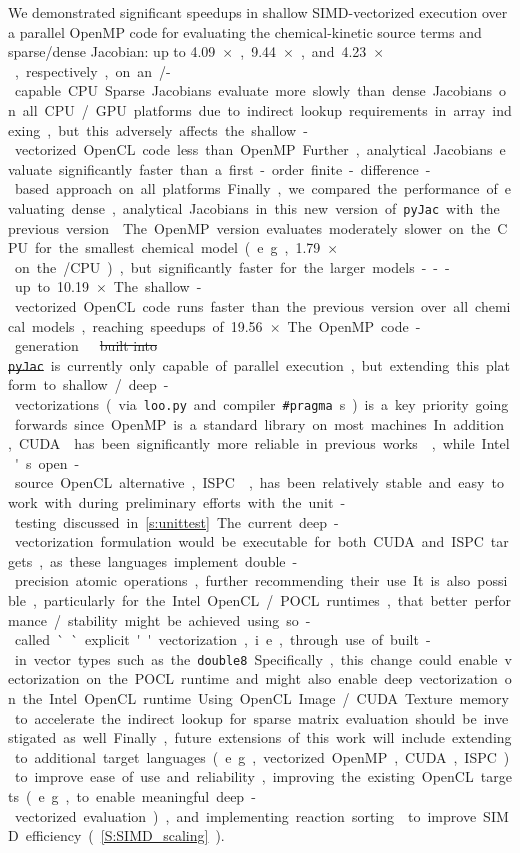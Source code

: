 \documentclass[12pt,number,sort&compress,preprint]{elsarticle}
\newcommand{\delete}[1]{\sloppy\cbcolor{RedOrange}\textcolor{RedOrange}{\cbdelete\sout{#1}}\xspace}
\newcommand{\delete}[1]{\xspace} %
\begin{document}
We demonstrated significant speedups in shallow SIMD-vectorized execution over a parallel OpenMP code for evaluating the chemical-kinetic source terms and sparse\slash dense Jacobian: up to \SI{4.09}{$\times$}, \SI{9.44}{$\times$}, and \SI{4.23}{$\times$}, respectively, on an \avx/-capable CPU.
Sparse Jacobians evaluate more slowly than dense Jacobians on all CPU\slash GPU platforms due to indirect lookup requirements in array indexing, but this adversely affects the shallow-vectorized OpenCL code less than OpenMP.
Further, analytical Jacobians evaluate significantly faster than a first-order finite-difference-based approach on all platforms.
Finally, we compared the performance of evaluating dense, analytical Jacobians in this new version of \texttt{pyJac} with the previous version~\cite{pyjac16}.
The OpenMP version evaluates moderately slower on the CPU for the smallest chemical model (e.g., \SI{1.79}{$\times$} on the \avx/ CPU), but significantly faster for the larger models---up to \SI{10.19}{$\times$}.
The shallow-vectorized OpenCL code runs faster than the previous version over all chemical models, reaching speedups of \SI{19.56}{$\times$}.

The OpenMP code-generation \delete{built into \texttt{pyJac}} is currently only capable of parallel execution, but extending this platform to shallow\slash deep-vectorizations (via \texttt{loo.py} and compiler \texttt{\#pragma}s) is a key priority going forwards since OpenMP is a standard library on most machines.
In addition, CUDA~\cite{Nvidia:2018} has been significantly more reliable in previous works~\cite{Niemeyer:2016aa,CurtisGPU:2017}, while Intel's open-source OpenCL alternative, ISPC~\cite{pharr2012ispc}, has been relatively stable and easy to work with during preliminary efforts with the unit-testing discussed in~\cref{s:unittest}.
The current deep-vectorization formulation would be executable for both CUDA and ISPC targets, as these languages implement double-precision atomic operations, further recommending their use.
It is also possible, particularly for the Intel OpenCL\slash POCL runtimes, that better performance\slash stability might be achieved using so-called ``explicit'' vectorization, i.e., through use of built-in vector types such as the \texttt{double8}.
Specifically, this change could enable vectorization on the POCL runtime and might also enable deep vectorization on the Intel OpenCL runtime.
Using OpenCL Image\slash CUDA Texture memory to accelerate the indirect lookup for sparse matrix evaluation should be investigated as well.
Finally, future extensions of this work will include extending to additional target languages (e.g., vectorized OpenMP, CUDA, ISPC) to improve ease of use and reliability, improving the existing OpenCL targets (e.g., to enable meaningful deep-vectorized evaluation), and implementing reaction sorting~\cite{Sewerin20151375} to improve SIMD efficiency (\cref{S:SIMD_scaling}).
\end{document}
